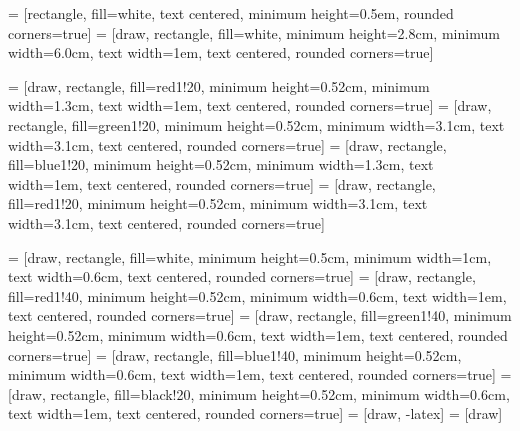  = [rectangle, fill=white, text centered, minimum height=0.5em, rounded corners=true]
 = [draw, rectangle, fill=white, minimum height=2.8cm, minimum width=6.0cm, text width=1em, text centered, rounded corners=true]

 = [draw, rectangle, fill=red1!20,   minimum height=0.52cm, minimum width=1.3cm, text width=1em, text centered, rounded corners=true]
 = [draw, rectangle, fill=green1!20, minimum height=0.52cm, minimum width=3.1cm, text width=3.1cm, text centered, rounded corners=true]
 = [draw, rectangle, fill=blue1!20,  minimum height=0.52cm, minimum width=1.3cm, text width=1em, text centered, rounded corners=true]
  = [draw, rectangle, fill=red1!20,   minimum height=0.52cm, minimum width=3.1cm, text width=3.1cm, text centered, rounded corners=true]

 = [draw, rectangle, fill=white, minimum height=0.5cm, minimum width=1cm, text width=0.6cm, text centered, rounded corners=true]
 = [draw, rectangle, fill=red1!40, minimum height=0.52cm, minimum width=0.6cm, text width=1em, text centered, rounded corners=true]
 = [draw, rectangle, fill=green1!40, minimum height=0.52cm, minimum width=0.6cm, text width=1em, text centered, rounded corners=true]
 = [draw, rectangle, fill=blue1!40, minimum height=0.52cm, minimum width=0.6cm, text width=1em, text centered, rounded corners=true]
 = [draw, rectangle, fill=black!20, minimum height=0.52cm, minimum width=0.6cm, text width=1em, text centered, rounded corners=true]
 = [draw, -latex]
 = [draw]



